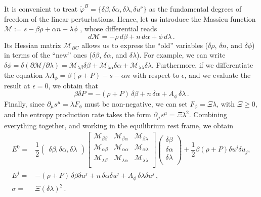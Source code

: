\documentclass[a4paper, amsfonts, amssymb, amsmath, reprint, showkeys, nofootinbib, twoside, onecolumn,notitlepage]{revtex4-1}
\begin{document}
It is convenient to treat $\tilde{\varphi}^B=\{\delta \beta, \delta \alpha, \delta \lambda,\delta u^\nu\}$ as the fundamental degrees of freedom of the linear perturbations. Hence, let us introduce the Massieu function $\mathcal{M}:=s-\beta \rho + \alpha n+\lambda \phi$ \cite{Callen_book}, whose differential reads
\begin{equation}
d\mathcal{M}=-\rho \, d\beta +n \, d\alpha +\phi \, d\lambda \, .
\end{equation}
Its Hessian matrix $\mathcal{M}_{BC}$ allows us to express the ``old'' variables ($\delta \rho$, $\delta n$, and $\delta \phi$) in terms of the ``new'' ones ($\delta \beta$, $\delta \alpha$, and $\delta \lambda$). For example, we can write $\delta \phi=\delta (\partial \mathcal{M}/\partial \lambda)=\mathcal{M}_{\lambda\beta} \delta \beta +\mathcal{M}_{\lambda\alpha} \delta \alpha+\mathcal{M}_{\lambda\lambda} \delta \lambda$. Furthermore, if we differentiate the equation $\lambda A_\phi =\beta (\rho+P)-s-\alpha n$ with respect to $\epsilon$, and we evaluate the result at $\epsilon=0$, we obtain that 
\begin{equation}\label{deppummo}
\beta \delta P =-(\rho+P) \,\delta \beta+n \,\delta \alpha+A_\phi \, \delta \lambda \, .
\end{equation}
Finally, since $\partial_\mu s^\mu =\lambda F_\phi$ must be non-negative, we can set $F_\phi=\Xi\lambda$, with $\Xi \geq 0$, and the entropy production rate takes the form $\partial_\mu s^\mu = \Xi \lambda^2$. Combining everything together, and working in the equilibrium rest frame, we obtain
\begin{equation}
\begin{split}
E^0 ={}& \dfrac{1}{2} 
\begin{pmatrix}
\delta \beta, \delta \alpha, \delta \lambda
\end{pmatrix} 
\begin{bmatrix}
\mathcal{M}_{\beta \beta} & \mathcal{M}_{\beta \alpha} & \mathcal{M}_{\beta \lambda} \\ 
\mathcal{M}_{\alpha \beta} & \mathcal{M}_{\alpha \alpha} & \mathcal{M}_{\alpha \lambda} \\ 
\mathcal{M}_{\lambda \beta} & \mathcal{M}_{\lambda \alpha} & \mathcal{M}_{\lambda \lambda} \\ 
\end{bmatrix}
\begin{pmatrix}
\delta \beta \\
\delta \alpha \\
\delta \lambda \\
\end{pmatrix}
+\dfrac{1}{2}\beta(\rho+P) \delta u^j \delta u_j , \\
E^j ={}& -(\rho+P) \,\delta \beta \delta u^j +n \,\delta \alpha \delta u^j +A_\phi \, \delta \lambda \delta u^j \, , \\
\sigma ={}& \Xi (\delta \lambda)^2 \, . \\
\end{split}
\end{equation}
\end{document}
